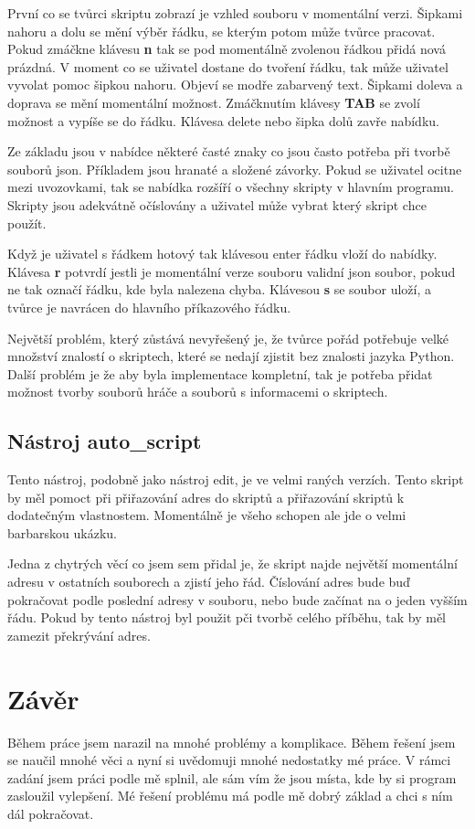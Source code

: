 \documentclass[12pt,a4paper]{article}
\begin{document}
První co se tvůrci skriptu zobrazí je vzhled souboru v momentální verzi. Šipkami nahoru a dolu se mění výběr řádku, se kterým potom může tvůrce pracovat. Pokud zmáčkne klávesu \textbf{n} tak se pod momentálně zvolenou řádkou přidá nová prázdná. V moment co se uživatel dostane do tvoření řádku, tak může uživatel vyvolat pomoc šipkou nahoru. Objeví se modře zabarvený text. Šipkami doleva a doprava se mění momentální možnost. Zmáčknutím klávesy \textbf{TAB} se zvolí možnost a vypíše se do řádku. Klávesa delete nebo šipka dolů zavře nabídku.

Ze základu jsou v nabídce některé časté znaky co jsou často potřeba při tvorbě souborů json. Příkladem jsou hranaté a složené závorky. Pokud se uživatel ocitne mezi uvozovkami, tak se nabídka rozšíří o všechny skripty v hlavním programu. Skripty jsou adekvátně očíslovány a uživatel může vybrat který skript chce použít.

Když je uživatel s řádkem hotový tak klávesou enter řádku vloží do nabídky. Klávesa \textbf{r} potvrdí jestli je momentální verze souboru validní json soubor, pokud ne tak označí řádku, kde byla nalezena chyba. Klávesou \textbf{s} se soubor uloží, a tvůrce je navrácen do hlavního příkazového řádku.

Největší problém, který zůstává nevyřešený je, že tvůrce pořád potřebuje velké množství znalostí o skriptech, které se nedají zjistit bez znalosti jazyka Python. Další problém je že aby byla implementace kompletní, tak je potřeba přidat možnost tvorby souborů hráče a souborů s informacemi o skriptech.
\subsection{Nástroj auto\_script}
Tento nástroj, podobně jako nástroj edit, je ve velmi raných verzích. Tento skript by měl pomoct při přiřazování adres do skriptů  a přiřazování skriptů k dodatečným vlastnostem. Momentálně je všeho schopen ale jde o velmi barbarskou ukázku.

Jedna z chytrých věcí co jsem sem přidal je, že skript najde největší momentální adresu v ostatních souborech a zjistí jeho řád. Číslování adres bude buď pokračovat podle poslední adresy v souboru, nebo bude začínat na o jeden vyšším řádu. Pokud by tento nástroj byl použit pči tvorbě celého příběhu, tak by měl zamezit překrývání adres.


\section{Závěr}
Během práce jsem narazil na mnohé problémy a komplikace. Během řešení jsem se naučil mnohé věci a nyní si uvědomuji mnohé nedostatky mé práce. V rámci zadání jsem práci podle mě splnil, ale sám vím že jsou místa, kde by si program zasloužil vylepšení. Mé řešení problému má podle mě dobrý základ a chci s ním dál pokračovat.
\end{document}
